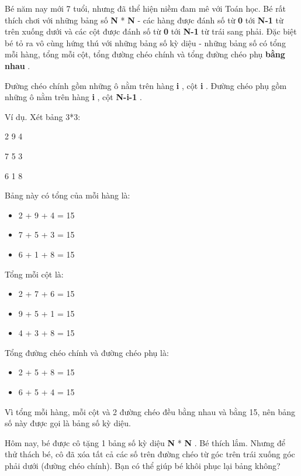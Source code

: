 



   Bé năm nay mới 7 tuổi, nhưng đã thể hiện niềm đam mê với Toán học. Bé rất thích chơi với những bảng số   \textbf{    N   }   *   \textbf{    N   }   - các hàng được đánh số từ   \textbf{    0   }   tới   \textbf{    N-1   }   từ trên xuống dưới và các cột được đánh số từ   \textbf{    0   }   tới   \textbf{    N-1   }   từ trái sang phải. Đặc biệt bé tỏ ra vô cùng hứng thú với những bảng số kỳ diệu - những bảng số có tổng mỗi hàng, tổng mỗi cột, tổng đường chéo chính và tổng đường chéo phụ   \textbf{    bằng nhau   }   .  

   Đường chéo chính gồm những ô nằm trên hàng   \textbf{    i   }   , cột   \textbf{    i   }   . Đường chéo phụ gồm những ô nằm trên hàng   \textbf{    i   }   , cột   \textbf{    N-i-1   }   .  

   Ví dụ. Xét bảng 3*3:  

   2 9 4  

   7 5 3  

   6 1 8  

   Bảng này có tổng của mỗi hàng là:  
\begin{itemize}
	\item     2 + 9 + 4 = 15   
	\item     7 + 5 + 3 = 15   
	\item     6 + 1 + 8 = 15   
\end{itemize}

   Tổng mỗi cột là:  
\begin{itemize}
	\item     2 + 7 + 6 = 15   
	\item     9 + 5 + 1 = 15   
	\item     4 + 3 + 8 = 15   
\end{itemize}

   Tổng đường chéo chính và đường chéo phụ là:  
\begin{itemize}
	\item     2 + 5 + 8 = 15   
	\item     6 + 5 + 4 = 15   
\end{itemize}

   Vì tổng mỗi hàng, mỗi cột và 2 đường chéo đều bằng nhau và bằng 15, nên bảng số này được gọi là bảng số kỳ diệu.  

   Hôm nay, bé được cô tặng 1 bảng số kỳ diệu   \textbf{    N   }   *   \textbf{    N   }   . Bé thích lắm. Nhưng để thử thách bé, cô đã xóa tất cả các số trên đường chéo từ góc trên trái xuống góc phải dưới (đường chéo chính). Bạn có thể giúp bé khôi phục lại bảng không?  

